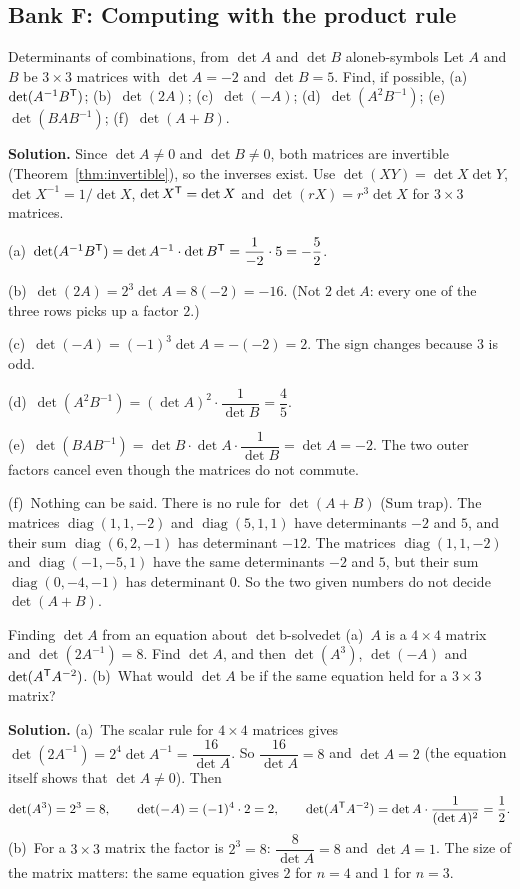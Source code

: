 \documentclass[11pt]{article}
\begin{document}
\subsection*{Bank F: Computing with the product rule}

\begin{exmp}{Determinants of combinations, from $\det A$ and $\det B$ alone}{b-symbols}
Let $A$ and $B$ be $3\times3$ matrices with $\det A=-2$ and $\det B=5$. Find, if possible, (a)~$\det(A^{-1}B^{\mathsf T})$; (b)~$\det(2A)$; (c)~$\det(-A)$; (d)~$\det(A^2B^{-1})$; (e)~$\det(BAB^{-1})$; (f)~$\det(A+B)$.

\textbf{Solution.} Since $\det A\neq0$ and $\det B\neq0$, both matrices are invertible (Theorem~\ref{thm:invertible}), so the inverses exist. Use $\det(XY)=\det X\det Y$, $\det X^{-1}=1/\det X$, $\det X^{\mathsf T}=\det X$ and $\det(rX)=r^3\det X$ for $3\times3$ matrices.

(a)~$\det(A^{-1}B^{\mathsf T})=\det A^{-1}\cdot\det B^{\mathsf T}=\dfrac1{-2}\cdot5=-\dfrac52$.

(b)~$\det(2A)=2^3\det A=8(-2)=-16$. (Not $2\det A$: every one of the three rows picks up a factor $2$.)

(c)~$\det(-A)=(-1)^3\det A=-(-2)=2$. The sign changes because $3$ is odd.

(d)~$\det(A^2B^{-1})=(\det A)^2\cdot\dfrac1{\det B}=\dfrac{4}{5}$.

(e)~$\det(BAB^{-1})=\det B\cdot\det A\cdot\dfrac1{\det B}=\det A=-2$. The two outer factors cancel even though the matrices do not commute.

(f)~Nothing can be said. There is no rule for $\det(A+B)$ (Sum trap). The matrices $\operatorname{diag}(1,1,-2)$ and $\operatorname{diag}(5,1,1)$ have determinants $-2$ and $5$, and their sum $\operatorname{diag}(6,2,-1)$ has determinant $-12$. The matrices $\operatorname{diag}(1,1,-2)$ and $\operatorname{diag}(-1,-5,1)$ have the same determinants $-2$ and $5$, but their sum $\operatorname{diag}(0,-4,-1)$ has determinant $0$. So the two given numbers do not decide $\det(A+B)$.
\end{exmp}

\begin{exmp}{Finding $\det A$ from an equation about $\det$}{b-solvedet}
(a)~$A$ is a $4\times4$ matrix and $\det(2A^{-1})=8$. Find $\det A$, and then $\det(A^3)$, $\det(-A)$ and $\det(A^{\mathsf T} A^{-2})$. (b)~What would $\det A$ be if the same equation held for a $3\times3$ matrix?

\textbf{Solution.} (a)~The scalar rule for $4\times4$ matrices gives $\det(2A^{-1})=2^4\det A^{-1}=\dfrac{16}{\det A}$. So $\dfrac{16}{\det A}=8$ and $\det A=2$ (the equation itself shows that $\det A\neq0$). Then
\[
\det(A^3)=2^3=8,\qquad \det(-A)=(-1)^4\cdot2=2,\qquad \det(A^{\mathsf T} A^{-2})=\det A\cdot\dfrac1{(\det A)^2}=\dfrac12.
\]
(b)~For a $3\times3$ matrix the factor is $2^3=8$: $\dfrac{8}{\det A}=8$ and $\det A=1$. The size of the matrix matters: the same equation gives $2$ for $n=4$ and $1$ for $n=3$.
\end{exmp}
\end{document}
